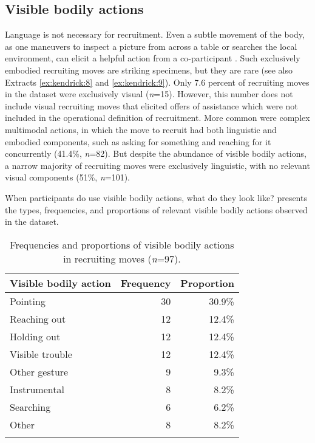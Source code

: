 \documentclass[output=paper,nonflat,modfont,draft]{langsci/langscibook}
\begin{document}
\subsection{Visible bodily actions}
Language is not necessary for recruitment. Even a subtle movement of the body, as one maneuvers to inspect a picture from across a table or searches the local environment, can elicit a helpful action from a co-participant \citep[see][]{KendrickDrew2016, DrewKendrick2018}. Such exclusively embodied recruiting moves are striking specimens, but they are rare (see also Extracts \ref{ex:kendrick:8} and \ref{ex:kendrick:9}). Only 7.6 percent of recruiting moves in the dataset were exclusively visual (\textit{n}=15). However, this number does not include visual recruiting moves that elicited offers of assistance which were not included in the operational definition of recruitment. More common were complex multimodal actions, in which the move to recruit had both linguistic and embodied components, such as asking for something and reaching for it concurrently (41.4\%, \textit{n}=82). But despite the abundance of visible bodily actions, a narrow majority of recruiting moves were exclusively linguistic, with no relevant visual components (51\%, \textit{n}=101).

When participants do use visible bodily actions, what do they look like?  presents the types, frequencies, and proportions of relevant visible bodily actions observed in the dataset.

\begin{table}
\begin{tabularx}{0.66\textwidth}{Xrr}
\lsptoprule
Visible bodily action & Frequency & Proportion\\
\midrule
Pointing & 30 & 30.9\%\\
Reaching out & 12 & 12.4\%\\
Holding out & 12 & 12.4\%\\
Visible trouble	& 12 & 12.4\%\\
Other gesture & 9 & 9.3\%\\
Instrumental & 8 & 8.2\%\\
Searching & 6 & 6.2\%\\
Other & 8 & 8.2\%\\
\lspbottomrule
\end{tabularx}

\caption{Frequencies and proportions of visible bodily actions in recruiting moves (\textit{n}=97).}
\label{tab:kendrick:1}
\end{table}
\end{document}
